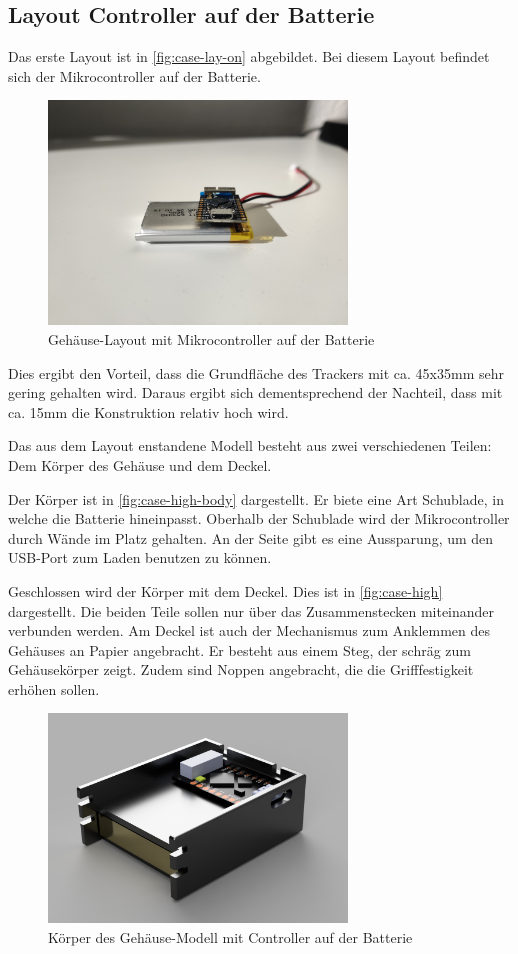 \subsection{Layout Controller auf der Batterie}
Das erste Layout ist in \autoref{fig:case-lay-on} abgebildet.
Bei diesem Layout befindet sich der Mikrocontroller auf der Batterie.

\begin{figure}[htbp]
	\includegraphics[width=300px]{images/case/pico_on_battery.jpg}
	\centering
	\caption{Gehäuse-Layout mit Mikrocontroller auf der Batterie}
	\label{fig:case-lay-on}
\end{figure}

Dies ergibt den Vorteil, dass die Grundfläche des Trackers mit ca. 45x35mm sehr gering gehalten wird.
Daraus ergibt sich dementsprechend der Nachteil, dass mit ca. 15mm die Konstruktion relativ hoch wird.

Das aus dem Layout enstandene Modell besteht aus zwei verschiedenen Teilen: Dem Körper des Gehäuse und dem Deckel.

Der Körper ist in \autoref{fig:case-high-body} dargestellt.
Er biete eine Art Schublade, in welche die Batterie hineinpasst.
Oberhalb der Schublade wird der Mikrocontroller durch Wände im Platz gehalten.
An der Seite gibt es eine Aussparung, um den \gls{USB}-Port zum Laden benutzen zu können.

Geschlossen wird der Körper mit dem Deckel.
Dies ist in \autoref{fig:case-high} dargestellt.
Die beiden Teile sollen nur über das Zusammenstecken miteinander verbunden werden.
Am Deckel ist auch der Mechanismus zum Anklemmen des Gehäuses an Papier angebracht.
Er besteht aus einem Steg, der schräg zum Gehäusekörper zeigt.
Zudem sind Noppen angebracht, die die Grifffestigkeit erhöhen sollen.

\begin{figure}[htbp]
	\includegraphics[width=300px]{images/case/high_body.png}
	\centering
	\caption{Körper des Gehäuse-Modell mit Controller auf der Batterie}
	\label{fig:case-high-body}
\end{figure}

